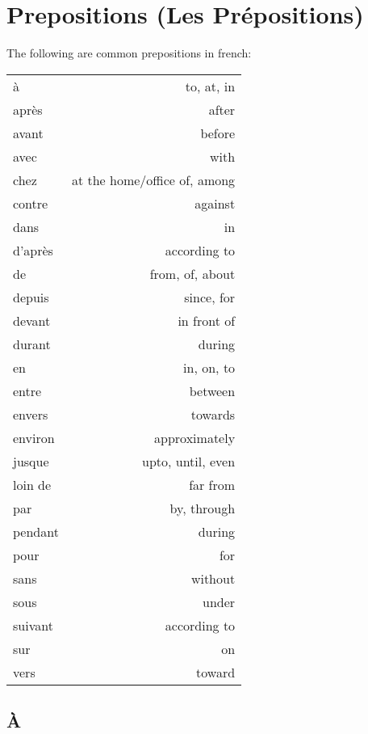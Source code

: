 \section{Prepositions (Les Pr\'epositions)}


The following are common prepositions in french:

\vspace{0.3in}

\begin{tabular}{l  r}
\`a       & to, at, in  \\
apr\`es   & after       \\
avant     & before      \\
avec      & with        \\
chez      & at the home/office of, among \\
contre    & against     \\
dans      & in          \\
d'apr\`es & according to \\
de        & from, of, about \\
depuis    & since, for  \\
devant    & in front of \\
durant    & during      \\
en        & in, on, to \\
entre     & between \\
envers    & towards \\
environ   & approximately \\
jusque    & upto, until, even \\
loin de   & far from  \\
par       & by, through\\
pendant   & during \\
pour      & for \\
sans      & without \\
sous      & under \\
suivant   & according to  \\
sur       & on  \\
vers      & toward \\
\end{tabular}

\subsection{\`A}

